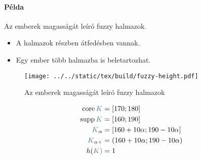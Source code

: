 \documentclass[../../main.tex]{subfiles}
\begin{document}
\paragraph{Példa} Az emberek magasságát leíró fuzzy halmazok.
\begin{itemize}
  \item A halmazok részben átfedésben vannak.
  \item Egy ember több halmazba is beletartozhat.
\end{itemize}
\begin{figure}[htb]
  \centering
  \texttt{[image: ../../static/tex/build/fuzzy-height.pdf]}
  \caption{Az emberek magasságát leíró fuzzy halmazok}
  \label{fig:fuzzy-height}
\end{figure}
\begin{align*}
  \core {\color{cyan!50!black}K}     & = [170; 180]                   \\
  \supp {\color{cyan!50!black}K}     & = [160; 190]                   \\
  {\color{cyan!50!black}K}_{\alpha}  & = [160+10\alpha; 190-10\alpha] \\
  {\color{cyan!50!black}K}_{\alpha+} & = (160+10\alpha; 190-10\alpha) \\
  h(\color{cyan!50!black}K)          & = 1                            \\
\end{align*}
\end{document}
